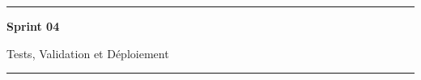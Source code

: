 \newpage
\thispagestyle{empty}
\vspace*{\fill}
\begin{center}
\rule{0.8\textwidth}{0.5pt}

\vspace{1cm}
{\Huge\bfseries Sprint 04}

\vspace{0.5cm}
{\LARGE Tests, Validation et Déploiement}
\vspace{1cm}

\rule{0.8\textwidth}{0.5pt}
\end{center}
\vspace*{\fill}
\newpage
